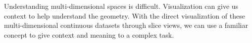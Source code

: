 
Understanding multi-dimensional spaces is difficult. Visualization can give
us context to help understand the geometry. With the direct visualization
of these multi-dimensional continuous datasets through slice views, we can
use a familiar concept to give context and meaning to a complex task.







